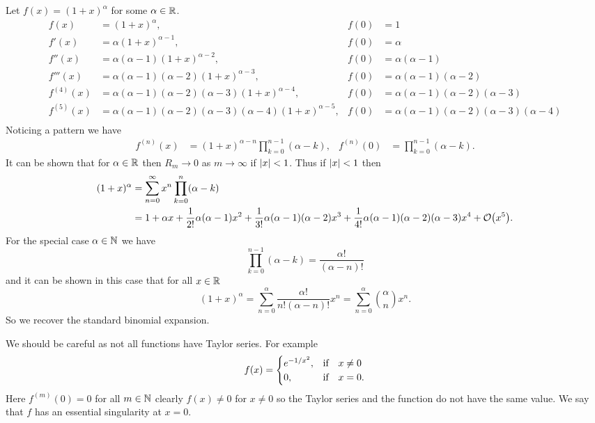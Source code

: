 Let \(f(x) = (1 + x)^\alpha\) for some \(\alpha\in\mathbb{R}\).
\begin{align*}
    f(x) &= (1 + x)^{\alpha}, & f(0) &= 1\\
    f'(x) &= \alpha(1 + x)^{\alpha-1}, & f(0) &= \alpha\\
    f''(x) &= \alpha(\alpha-1)(1 + x)^{\alpha-2}, & f(0) &= \alpha(\alpha-1)\\
    f'''(x) &= \alpha(\alpha-1)(\alpha-2)(1 + x)^{\alpha-3}, & f(0) &= \alpha(\alpha-1)(\alpha-2)\\
    f^{(4)}(x) &= \alpha(\alpha-1)(\alpha-2)(\alpha-3)(1 + x)^{\alpha-4}, & f(0) &= \alpha(\alpha-1)(\alpha-2)(\alpha-3)\\
    f^{(5)}(x) &= \alpha(\alpha-1)(\alpha-2)(\alpha-3)(\alpha-4)(1 + x)^{\alpha-5}, & f(0) &= \alpha(\alpha-1)(\alpha-2)(\alpha-3)(\alpha-4)\\
\end{align*}
Noticing a pattern we have
\begin{align*}
    f^{(n)}(x) &= (1 + x)^{\alpha-n}\prod_{k=0}^{n-1}(\alpha-k), & f^{(n)}(0) &= \prod_{k=0}^{n-1}(\alpha - k).
\end{align*}
It can be shown that for \(\alpha\in\mathbb{R}\) then \(R_m\to 0\) as \(m\to\infty\) if \(\abs{x} < 1\).
Thus if \(\abs{x} < 1\) then
\begin{align*}
    (1 + x)^\alpha &= \sum_{n=0}^{\infty} x^n\prod_{k=0}^{n}(\alpha - k)\\
    &= 1 + \alpha x + \frac{1}{2!}\alpha(\alpha-1)x^2 + \frac{1}{3!}\alpha(\alpha-1)(\alpha-2)x^3 + \frac{1}{4!}\alpha(\alpha-1)(\alpha-2)(\alpha-3)x^4 + \order{x^5}.
\end{align*}
For the special case \(\alpha\in\mathbb{N}\) we have
\[\prod_{k=0}^{n-1} (\alpha - k) = \frac{\alpha!}{(\alpha - n)!}\]
and it can be shown in this case that for all \(x\in\mathbb{R}\)
\[(1 + x)^{\alpha} = \sum_{n=0}^{\alpha}\frac{\alpha!}{n!(\alpha - n)!}x^n = \sum_{n=0}^{\alpha}\binom{\alpha}{n}x^n.\]
So we recover the standard binomial expansion.

We should be careful as not all functions have Taylor series.
For example
\[
f(x) = 
\begin{cases}
    e^{-1/x^2}, & \qif* x \ne 0\\
    0, &\qif* x = 0.
\end{cases}
\]
Here \(f^{(m)}(0) = 0\) for all \(m\in\mathbb{N}\) clearly \(f(x)\ne 0\) for \(x\ne 0\) so the Taylor series and the function do not have the same value.
We say that \(f\) has an essential singularity at \(x = 0\).

